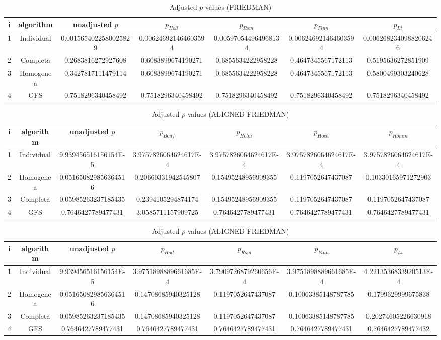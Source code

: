\documentclass[a4paper,10pt]{article}
\begin{document}
\begin{landscape}
\begin{table}[!htp]
\centering\scriptsize
\caption{Adjusted $p$-values (FRIEDMAN)}
\begin{tabular}{ccccccc}
i&algorithm&unadjusted $p$&$p_{Holl}$&$p_{Rom}$&$p_{Finn}$&$p_{Li}$\\
\hline
1&Individual&0.0015654022580025829&0.006246921464603594&0.005970544964968134&0.006246921464603594&0.0062682340988206246\\
2&Completa&0.2683816272927608&0.6083899674190271&0.6855634222958228&0.4647345567172113&0.5195636272851909\\
3&Homogenea&0.3427817111479114&0.6083899674190271&0.6855634222958228&0.4647345567172113&0.5800499303240628\\
4&GFS&0.7518296340458492&0.7518296340458492&0.7518296340458492&0.7518296340458492&0.7518296340458492\\
\hline
\end{tabular}
\end{table}


\newpage

\begin{table}[!htp]
\centering\scriptsize
\caption{Adjusted $p$-values (ALIGNED FRIEDMAN)}
\begin{tabular}{ccccccc}
i&algorithm&unadjusted $p$&$p_{Bonf}$&$p_{Holm}$&$p_{Hoch}$&$p_{Homm}$\\
\hline
1&Individual&9.939456516156154E-5&3.9757826064624617E-4&3.9757826064624617E-4&3.9757826064624617E-4&3.9757826064624617E-4\\
2&Homogenea&0.051650829856364516&0.20660331942545807&0.15495248956909355&0.1197052647437087&0.10330165971272903\\
3&Completa&0.05985263237185435&0.2394105294874174&0.15495248956909355&0.1197052647437087&0.1197052647437087\\
4&GFS&0.7646427789477431&3.0585711157909725&0.7646427789477431&0.7646427789477431&0.7646427789477431\\
\hline
\end{tabular}
\end{table}

\begin{table}[!htp]
\centering\scriptsize
\caption{Adjusted $p$-values (ALIGNED FRIEDMAN)}
\begin{tabular}{ccccccc}
i&algorithm&unadjusted $p$&$p_{Holl}$&$p_{Rom}$&$p_{Finn}$&$p_{Li}$\\
\hline
1&Individual&9.939456516156154E-5&3.9751898889661685E-4&3.7909726879260656E-4&3.9751898889661685E-4&4.2213536833920513E-4\\
2&Homogenea&0.051650829856364516&0.14708685940325128&0.1197052647437087&0.10063385148787785&0.1799629999675838\\
3&Completa&0.05985263237185435&0.14708685940325128&0.1197052647437087&0.10063385148787785&0.20274605226630918\\
4&GFS&0.7646427789477431&0.7646427789477431&0.7646427789477431&0.7646427789477431&0.7646427789477432\\
\hline
\end{tabular}
\end{table}



\end{landscape}
\end{document}
